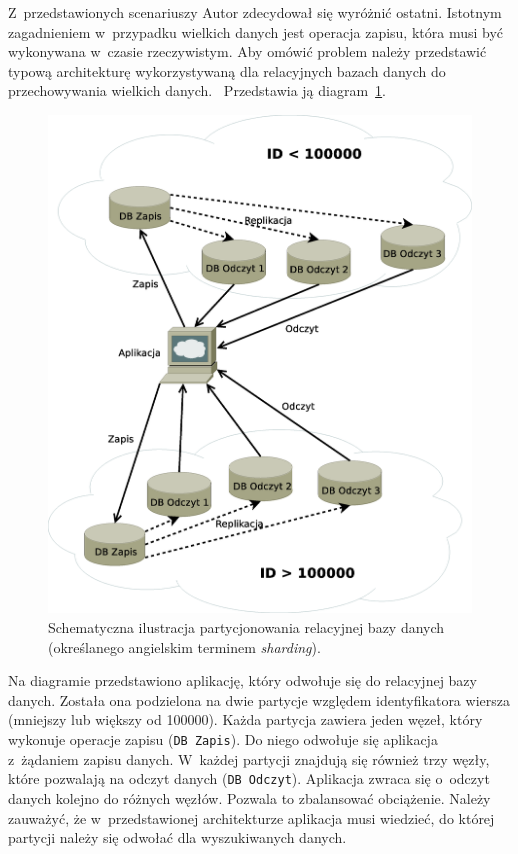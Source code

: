 Z~przedstawionych scenariuszy Autor zdecydował się wyróżnić ostatni. Istotnym zagadnieniem w~przypadku wielkich danych jest operacja zapisu, która musi być wykonywana w~czasie rzeczywistym. Aby omówić problem należy przedstawić typową architekturę wykorzystywaną dla relacyjnych bazach danych do przechowywania wielkich danych.~\cite{sharding_in_mysql} Przedstawia ją diagram~\ref{fig:sharding}.

\begin{figure}[ht!]
	\centering
	\includegraphics[width=.8\textwidth]{figures/sharding.eps}
	\caption{Schematyczna ilustracja partycjonowania relacyjnej bazy danych (określanego angielskim terminem \emph{sharding}).}
	\label{fig:sharding}
\end{figure}

Na diagramie przedstawiono aplikację, który odwołuje się do relacyjnej bazy danych. Została ona podzielona na dwie partycje względem identyfikatora wiersza (mniejszy lub większy od 100000). Każda partycja zawiera jeden węzeł, który wykonuje operacje zapisu (\verb+DB Zapis+). Do niego odwołuje się aplikacja z~żądaniem zapisu danych. W~każdej partycji znajdują się również trzy węzły, które pozwalają na odczyt danych (\verb+DB Odczyt+). Aplikacja zwraca się o~odczyt danych kolejno do różnych węzłów. Pozwala to zbalansować obciążenie. Należy zauważyć, że w~przedstawionej architekturze aplikacja musi wiedzieć, do której partycji należy się odwołać dla wyszukiwanych danych.

